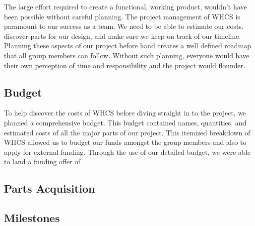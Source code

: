 The large effort required to create a functional, working product, wouldn't
have been possible without careful planning. The project management of WHCS is
paramount to our success as a team. We need to be able to estimate our costs,
discover parts for our design, and make sure we keep on track of our timeline.
Planning these aspects of our project before hand creates a well defined
roadmap that all group members can follow. Without such planning, everyone
would have their own perception of time and responsibility and the project
would flounder.

\subsection{Budget}
To help discover the costs of WHCS before diving straight in to the project, we
planned a comprehensive budget. This budget contained names, quantities, and
estimated costs of all the major parts of our project. This itemized breakdown
of WHCS allowed us to budget our funds amongst the group members and also to
apply for external funding. Through the use of our detailed budget, we were
able to land a funding offer of 

\subsection{Parts Acquisition}

\subsection{Milestones}

